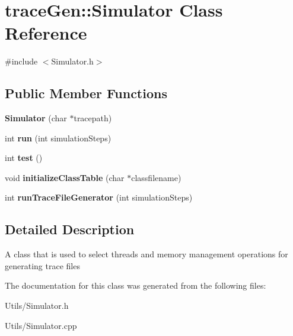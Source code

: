 \hypertarget{classtrace_gen_1_1_simulator}{}\section{trace\+Gen\+:\+:Simulator Class Reference}
\label{classtrace_gen_1_1_simulator}


{\ttfamily \#include $<$Simulator.\+h$>$}

\subsection*{Public Member Functions}
\begin{DoxyCompactItemize}
\item 
\hypertarget{classtrace_gen_1_1_simulator_ae197916c0f722c8598d77aa8271de396}{}{\bfseries Simulator} (char $\ast$tracepath)\label{classtrace_gen_1_1_simulator_ae197916c0f722c8598d77aa8271de396}

\item 
\hypertarget{classtrace_gen_1_1_simulator_aaebbc1871a883810b60ec50a71b50436}{}int {\bfseries run} (int simulation\+Steps)\label{classtrace_gen_1_1_simulator_aaebbc1871a883810b60ec50a71b50436}

\item 
\hypertarget{classtrace_gen_1_1_simulator_aaad64799c032b21376a6524ec8f2a003}{}int {\bfseries test} ()\label{classtrace_gen_1_1_simulator_aaad64799c032b21376a6524ec8f2a003}

\item 
\hypertarget{classtrace_gen_1_1_simulator_a6f257e54515e3268a54a7237e817dac2}{}void {\bfseries initialize\+Class\+Table} (char $\ast$classfilename)\label{classtrace_gen_1_1_simulator_a6f257e54515e3268a54a7237e817dac2}

\item 
\hypertarget{classtrace_gen_1_1_simulator_aafe0112a4bc9c2504794a2a9e1cc7e23}{}int {\bfseries run\+Trace\+File\+Generator} (int simulation\+Steps)\label{classtrace_gen_1_1_simulator_aafe0112a4bc9c2504794a2a9e1cc7e23}

\end{DoxyCompactItemize}


\subsection{Detailed Description}
A class that is used to select threads and memory management operations for generating trace files 

The documentation for this class was generated from the following files\+:\begin{DoxyCompactItemize}
\item 
Utils/Simulator.\+h\item 
Utils/Simulator.\+cpp\end{DoxyCompactItemize}
